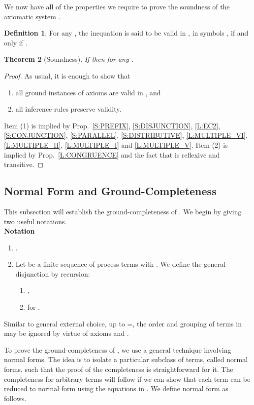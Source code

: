 \documentclass{elsarticle}
\theoremstyle{plain}
\newtheorem{theorem}{Theorem}[section]
\theoremstyle{definition}
\newtheorem{mydefn}[theorem]{Definition}
\begin{document}
We now have all of the properties we require to prove the soundness of the axiomatic system .

\begin{mydefn}
  For any , the inequation  is said to be valid in , in symbols , if and only if .
\end{mydefn}

\begin{theorem}[Soundness]\label{T:SOUNDNESS}
If  then  for any .
\end{theorem}
\begin{proof}
As usual, it is enough to show that
\begin{enumerate}
  \item all ground instances of axioms are valid in , and
  \item all inference rules preserve validity.
\end{enumerate}
Item (1) is implied by Prop.~\ref{S:PREFIX}, \ref{S:DISJUNCTION}, \ref{L:EC2}, \ref{S:CONJUNCTION}, \ref{S:PARALLEL}, \ref{S:DISTRIBUTIVE}, \ref{L:MULTIPLE_VI}, \ref{L:MULTIPLE_II}, \ref{L:MULTIPLE_I} and \ref{L:MULTIPLE_V}.
Item (2) is implied by Prop.~\ref{L:CONGRUENCE} and the fact that  is reflexive and transitive.
\end{proof}

\subsection{Normal Form and Ground-Completeness}
This subsection will establish the ground-completeness of . We begin by giving two useful notations.\\

\noindent \textbf{Notation}
\begin{enumerate}
  \item .
  \item Let  be a finite sequence of process terms with . We define the general disjunction  by recursion:
    \begin{enumerate}
    \item ,
    \item  for .
    \end{enumerate}
\end{enumerate}

Similar to general external choice, up to =, the order and grouping of terms in   may be ignored by virtue of axioms  and .

To prove the ground-completeness of , we use a general technique involving normal forms.
The idea is to isolate a particular subclass of terms, called normal forms, such that the proof of the completeness is straightforward for it.
The completeness for arbitrary terms will follow if we can show that each term can be reduced to normal form using the equations in .
We define normal form as follows.
\end{document}
